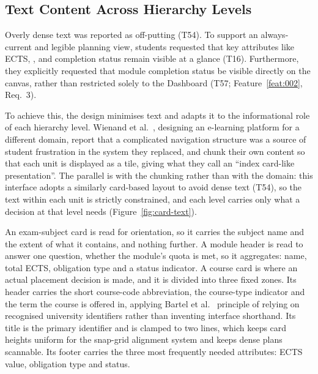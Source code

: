 \subsection{Text Content Across Hierarchy Levels}
\label{sec:text-content}
Overly dense text was reported as off-putting (T54). To support an always-current and legible planning view, students requested that key attributes like ECTS, , and completion status remain visible at a glance (T16). Furthermore, they explicitly requested that module completion status be visible directly on the canvas, rather than restricted solely to the Dashboard (T57; Feature~\ref{feat:002}, Req.~3). 

To achieve this, the design minimises text and adapts it to the informational role of each hierarchy level. Wienand et al.~\cite{wienand_design_2024}, designing an e-learning platform for a different domain, report that a complicated navigation structure was a source of student frustration in the system they replaced, and chunk their own content so that each unit is displayed as a tile, giving what they call an \enquote{index card-like presentation}. The parallel is with the chunking rather than with the domain: this interface adopts a similarly card-based layout to avoid dense text (T54), so the text within each unit is strictly constrained, and each level carries only what a decision at that level needs (Figure~\ref{fig:card-text}).

An exam-subject card is read for orientation, so it carries the subject name and the extent of what it contains, and nothing further. A module header is read to answer one question, whether the module's quota is met, so it aggregates: name, total ECTS, obligation type and a status indicator. A course card is where an actual placement decision is made, and it is divided into three fixed zones. Its header carries the short course-code abbreviation, the course-type indicator and the term the course is offered in, applying Bartel et al.~\cite{bartel_design_2024} principle of relying on recognised university identifiers rather than inventing interface shorthand. Its title is the primary identifier and is clamped to two lines, which keeps card heights uniform for the snap-grid alignment system and keeps dense plans scannable. Its footer carries the three most frequently needed attributes: ECTS value, obligation type and status.

